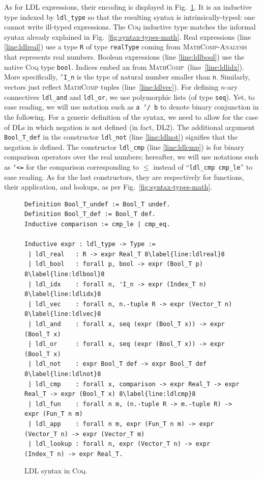 \documentclass[a4paper,UKenglish,cleveref, autoref, thm-restate]{lipics-v2021}
\def\coqin#1{\texttt{#1}}
\def\DLtwo{\textrm{DL2}}
\def\coq{\textsc{Coq}}
\def\mathcomp{\textsc{MathComp}}
\def\analysis{\textsc{MathComp-Analysis}}
\begin{document}
As for LDL expressions, their encoding is displayed in
Fig.~\ref{fig:syntax-coq}.  It is an inductive type indexed by
\coqin{ldl_type} so that the resulting syntax is intrinsically-typed:
one cannot write ill-typed expressions.
%
The \coq{} inductive type matches the informal syntax already
explained in Fig.~\ref{fig:syntax-types-math}.
%
Real expressions (line \ref{line:ldlreal}) use a type \coqin{R} of
type \coqin{realType} coming from \analysis{}~\cite{analysis} that represents real
numbers.
%
Boolean expressions (line \ref{line:ldlbool}) use the native \coq{}
type \coqin{bool}.
%
Indices embed an  from \mathcomp\ (line~\ref{line:ldlidx}).
More specifically, \coqin{'I_n} is the type of natural number smaller than \coqin{n}.
%
Similarly, vectors just reflect \mathcomp{}
tuples (line~\ref{line:ldlvec}).
%
For defining $n$-ary connectives \coqin{ldl_and} and \coqin{ldl_or},
we use polymorphic lists (of type \coqin{seq}).
%
Yet, to ease reading, we will use notation such as \coqin{a `/\ b} to denote binary conjunction
in the following.
%
For a generic definition of the syntax, we need to allow for the case
of DLs in which negation is not defined (in fact, \DLtwo).
%
The additional argument \coqin{Bool_T_def} in the constructor
\coqin{ldl_not} (line \ref{line:ldlnot}) signifies that the negation is defined.
%
The constructor \coqin{ldl_cmp} (line \ref{line:ldlcmp}) is for binary
comparison operators over the real numbers; hereafter, we will use
notations such as \coqin{`<=} for the comparison corresponding to
$\leq$ instead of ``\coqin{ldl_cmp cmp_le}'' to ease reading.
%
As for the last constructors, they are respectively for functions,
their application, and lookups, as per Fig.~\ref{fig:syntax-types-math}.

\begin{figure}[h]
\begin{verbatim}
Definition Bool_T_undef := Bool_T undef.
Definition Bool_T_def := Bool_T def.
Inductive comparison := cmp_le | cmp_eq.

Inductive expr : ldl_type -> Type :=
 | ldl_real   : R -> expr Real_T 8\label{line:ldlreal}8
 | ldl_bool   : forall p, bool -> expr (Bool_T p) 8\label{line:ldlbool}8
 | ldl_idx    : forall n, 'I_n -> expr (Index_T n) 8\label{line:ldlidx}8
 | ldl_vec    : forall n, n.-tuple R -> expr (Vector_T n) 8\label{line:ldlvec}8
 | ldl_and    : forall x, seq (expr (Bool_T x)) -> expr (Bool_T x)
 | ldl_or     : forall x, seq (expr (Bool_T x)) -> expr (Bool_T x)
 | ldl_not    : expr Bool_T def -> expr Bool_T def 8\label{line:ldlnot}8
 | ldl_cmp    : forall x, comparison -> expr Real_T -> expr Real_T -> expr (Bool_T x) 8\label{line:ldlcmp}8
 | ldl_fun    : forall n m, (n.-tuple R -> m.-tuple R) -> expr (Fun_T n m)
 | ldl_app    : forall n m, expr (Fun_T n m) -> expr (Vector_T n) -> expr (Vector_T m)
 | ldl_lookup : forall n, expr (Vector_T n) -> expr (Index_T n) -> expr Real_T.
\end{verbatim}
\caption{LDL syntax in \coq.}
\label{fig:syntax-coq}
\end{figure}
\end{document}
